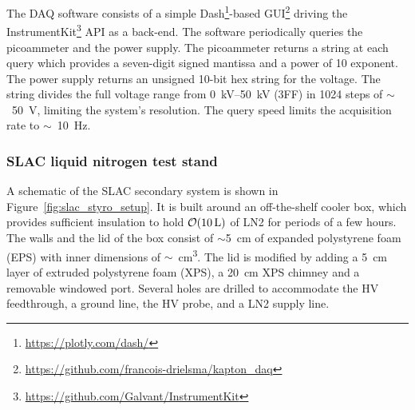 \documentclass[a4paper,12pt]{article}
\begin{document}
The DAQ software consists of a simple Dash\footnote{\href{https://plotly.com/dash/}{https://plotly.com/dash/}}-based GUI\footnote{\href{https://github.com/francois-drielsma/kapton_daq}{https://github.com/francois-drielsma/kapton\_daq}} driving the InstrumentKit\footnote{\href{https://github.com/Galvant/InstrumentKit}{https://github.com/Galvant/InstrumentKit}} API as a back-end. 
The software periodically queries the picoammeter and the power supply. 
The picoammeter returns a string at each query which provides a seven-digit signed mantissa and a power of 10 exponent. 
The power supply returns an unsigned 10-bit hex string for the voltage. 
The string divides the full voltage range from \SIrange{0}{50}{\kilo\volt} (3FF) in 1024 steps of $\sim$~\SI{50}{\volt}, limiting the system's resolution. 
The query speed limits the acquisition rate to $\sim$~\SI{10}{\hertz}.

\subsubsection{SLAC liquid nitrogen test stand}

A schematic of the SLAC secondary system is shown in Figure~\ref{fig:slac_styro_setup}. 
It is built around an off-the-shelf cooler box, which provides sufficient insulation to hold $\order{\SI{10}{\liter}}$ of LN2 for periods of a few hours. 
The walls and the lid of the box consist of $\sim$\SI{5}{\centi\meter} of expanded polystyrene foam (EPS) with inner dimensions of $\sim$~\unit{\centi\metre\cubed}.
The lid is modified by adding a \SI{5}{\centi\meter} layer of extruded polystyrene foam (XPS), a \SI{20}{\centi\meter} XPS chimney and a removable windowed port. 
Several holes are drilled to accommodate the HV feedthrough, a ground line, the HV probe, and a LN2 supply line.
\end{document}
